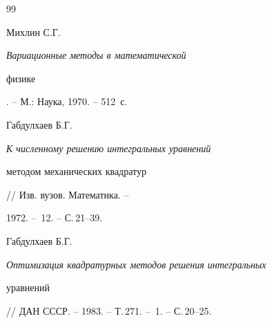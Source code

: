 \begin{thebibliography}{99}


Михлин С.Г. {\em Вариационные методы в математической 


физике}. -- М.: Наука, 1970. -- 512~с.




Габдулхаев Б.Г. {\em К численному решению интегральных уравнений 


методом механических квадратур} // Изв. вузов. Математика. --


1972. --  \No\,12. -- С.\,21--39.




Габдулхаев Б.Г. {\em Оптимизация квадратурных методов решения интегральных


уравнений} // ДАН СССР. -- 1983. -- Т.\,271. -- \No\,1. -- С.\,20--25.





\end{thebibliography}





\vskip 1cm












\label{end}








